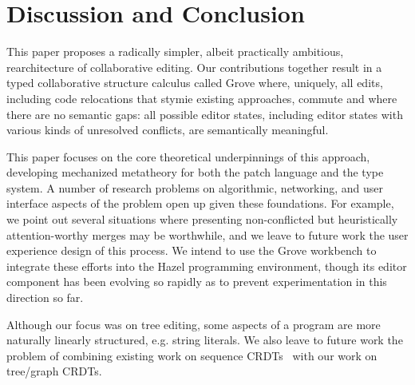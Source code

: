 
\section{Discussion and Conclusion}%
\label{sec:Discussion and Conclusion}


This paper proposes a radically simpler, albeit practically ambitious, rearchitecture of collaborative editing. Our contributions together result in a typed collaborative structure calculus called Grove 
where, uniquely, all edits, including code relocations that stymie existing approaches, commute and where there are no semantic gaps: all possible editor states, including editor states with various kinds of unresolved conflicts, are semantically meaningful. 

This paper focuses on the core theoretical underpinnings of this approach,
developing mechanized metatheory for both the patch language and the type system. 
A number of research problems on algorithmic, networking, and user interface aspects of the problem open up given these foundations. For example, we point out several situations where presenting non-conflicted but heuristically attention-worthy merges may be worthwhile, and we leave to future work the user experience design of this process. We intend to use the Grove workbench to integrate these efforts into the Hazel programming environment, though its editor component has been evolving so rapidly as to prevent experimentation in this direction so far.

Although our focus was on tree editing, some aspects of a program are more naturally linearly structured, e.g. string literals. We also leave to future work the problem of combining existing work on sequence CRDTs~\cite{ahmed2011evaluating,kleppmann2020moving} with our work on tree/graph CRDTs.







